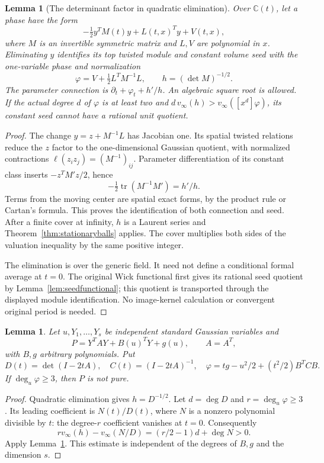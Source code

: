 \documentclass[11pt]{article}
\newtheorem{lemma}[theorem]{Lemma}
\theoremstyle{definition}\newtheorem{definition}[theorem]{Definition}
\theoremstyle{remark}\newtheorem{remark}[theorem]{Remark}
\newcommand{\C}{\mathbb C}
\begin{document}
\begin{lemma}[The determinant factor in quadratic elimination]
\label{lem:quadraticelimination}
Over $\C(t)$, let a phase have the form
\[
 -\tfrac12 y^T M(t)y+L(t,x)^Ty+V(t,x),
\]
where $M$ is an invertible symmetric matrix and $L,V$ are
polynomial in $x$. Eliminating $y$ identifies its top twisted
module and constant volume seed with the one-variable phase
and normalization
\[
 \varphi=V+\tfrac12L^TM^{-1}L,\qquad
 h=(\det M)^{-1/2}.
\]
The parameter connection is
$\partial_t+\varphi_t+h'/h$. An algebraic square root is allowed.
If the actual degree $d$ of $\varphi$ is at least two and
$d\,v_\infty(h)>v_\infty([x^d]\varphi)$, its constant seed
cannot have a rational unit quotient.
\end{lemma}
\begin{proof}
The change $y=z+M^{-1}L$ has Jacobian one. Its spatial twisted
relations reduce the $z$ factor to the one-dimensional Gaussian
quotient, with normalized contractions
$\ell(z_i z_j)=(M^{-1})_{ij}$. Parameter differentiation of its
constant class inserts $-z^TM'z/2$, hence
\[
 -\tfrac12\operatorname{tr}(M^{-1}M')=h'/h.
\]
Terms from the moving center are spatial exact forms, by the
product rule or Cartan's formula. This proves the identification
of both connection and seed. After a finite cover at infinity,
$h$ is a Laurent series and Theorem~\ref{thm:stationaryballs}
applies. The cover multiplies both sides of the valuation
inequality by the same positive integer.

The elimination is over the generic field. It need not define
a conditional formal average at $t=0$. The original Wick
functional first gives its rational seed quotient by
Lemma~\ref{lem:seedfunctional}; this quotient is transported
through the displayed module identification. No image-kernel
calculation or convergent original period is needed.
\end{proof}

\begin{lemma}\label{lem:quadraticfibrehighdegree}
Let $u,Y_1,\ldots,Y_s$ be independent standard Gaussian variables
and
\[
 P=Y^TAY+B(u)^TY+g(u),\qquad A=A^T,
\]
with $B,g$ arbitrary polynomials. Put
\[
 D(t)=\det(I-2tA),\quad C(t)=(I-2tA)^{-1},\quad
 \varphi=tg-u^2/2+(t^2/2)B^TCB.
\]
If $\deg_u\varphi\ge3$, then $P$ is not pure.
\end{lemma}
\begin{proof}
Quadratic elimination gives $h=D^{-1/2}$. Let $d=\deg D$ and
$r=\deg_u\varphi\ge3$. Its leading coefficient is $N(t)/D(t)$,
where $N$ is a nonzero polynomial divisible by $t$:
the degree-$r$ coefficient vanishes at $t=0$. Consequently
\[
 r v_\infty(h)-v_\infty(N/D)
     =(r/2-1)d+\deg N>0.
\]
Apply Lemma~\ref{lem:quadraticelimination}. This estimate is
independent of the degrees of $B,g$ and the dimension $s$.
\end{proof}
\end{document}
